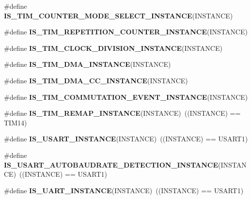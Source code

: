 \begin{DoxyCompactItemize}
\item 
\#define {\bfseries I\+S\+\_\+\+T\+I\+M\+\_\+\+C\+O\+U\+N\+T\+E\+R\+\_\+\+M\+O\+D\+E\+\_\+\+S\+E\+L\+E\+C\+T\+\_\+\+I\+N\+S\+T\+A\+N\+CE}(I\+N\+S\+T\+A\+N\+CE)
\item 
\#define {\bfseries I\+S\+\_\+\+T\+I\+M\+\_\+\+R\+E\+P\+E\+T\+I\+T\+I\+O\+N\+\_\+\+C\+O\+U\+N\+T\+E\+R\+\_\+\+I\+N\+S\+T\+A\+N\+CE}(I\+N\+S\+T\+A\+N\+CE)
\item 
\#define {\bfseries I\+S\+\_\+\+T\+I\+M\+\_\+\+C\+L\+O\+C\+K\+\_\+\+D\+I\+V\+I\+S\+I\+O\+N\+\_\+\+I\+N\+S\+T\+A\+N\+CE}(I\+N\+S\+T\+A\+N\+CE)
\item 
\#define {\bfseries I\+S\+\_\+\+T\+I\+M\+\_\+\+D\+M\+A\+\_\+\+I\+N\+S\+T\+A\+N\+CE}(I\+N\+S\+T\+A\+N\+CE)
\item 
\#define {\bfseries I\+S\+\_\+\+T\+I\+M\+\_\+\+D\+M\+A\+\_\+\+C\+C\+\_\+\+I\+N\+S\+T\+A\+N\+CE}(I\+N\+S\+T\+A\+N\+CE)
\item 
\#define {\bfseries I\+S\+\_\+\+T\+I\+M\+\_\+\+C\+O\+M\+M\+U\+T\+A\+T\+I\+O\+N\+\_\+\+E\+V\+E\+N\+T\+\_\+\+I\+N\+S\+T\+A\+N\+CE}(I\+N\+S\+T\+A\+N\+CE)
\item 
\mbox{\label{group___exported__macro_ga6bb03cf116b07bfe1bd527f8ab61a7f9}} 
\#define {\bfseries I\+S\+\_\+\+T\+I\+M\+\_\+\+R\+E\+M\+A\+P\+\_\+\+I\+N\+S\+T\+A\+N\+CE}(I\+N\+S\+T\+A\+N\+CE)~((I\+N\+S\+T\+A\+N\+CE) == T\+I\+M14)
\item 
\mbox{\label{group___exported__macro_gafbce654f84a7c994817453695ac91cbe}} 
\#define {\bfseries I\+S\+\_\+\+U\+S\+A\+R\+T\+\_\+\+I\+N\+S\+T\+A\+N\+CE}(I\+N\+S\+T\+A\+N\+CE)~((I\+N\+S\+T\+A\+N\+CE) == U\+S\+A\+R\+T1)
\item 
\mbox{\label{group___exported__macro_ga4130cef42f8cada5a91c38b85f76939e}} 
\#define {\bfseries I\+S\+\_\+\+U\+S\+A\+R\+T\+\_\+\+A\+U\+T\+O\+B\+A\+U\+D\+R\+A\+T\+E\+\_\+\+D\+E\+T\+E\+C\+T\+I\+O\+N\+\_\+\+I\+N\+S\+T\+A\+N\+CE}(I\+N\+S\+T\+A\+N\+CE)~((I\+N\+S\+T\+A\+N\+CE) == U\+S\+A\+R\+T1)
\item 
\mbox{\label{group___exported__macro_gacbd2efab4cd39d4867c4dbeacb87e84b}} 
\#define {\bfseries I\+S\+\_\+\+U\+A\+R\+T\+\_\+\+I\+N\+S\+T\+A\+N\+CE}(I\+N\+S\+T\+A\+N\+CE)~((I\+N\+S\+T\+A\+N\+CE) == U\+S\+A\+R\+T1)
\item 
\mbox{\label{group___exported__macro_ga69c4aa0c561c4c39c621710fbbb0cb7b}} 

\end{DoxyCompactItemize}
